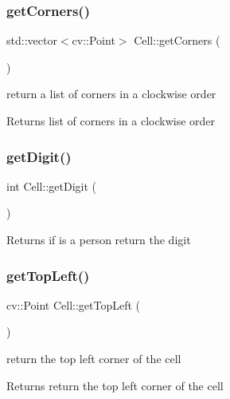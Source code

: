 \subsubsection{\texorpdfstring{get\+Corners()}{getCorners()}}
{\footnotesize\ttfamily std\+::vector$<$cv\+::\+Point$>$ Cell\+::get\+Corners (\begin{DoxyParamCaption}{ }\end{DoxyParamCaption})}

return a list of corners in a clockwise order \begin{DoxyReturn}{Returns}
list of corners in a clockwise order 
\end{DoxyReturn}
\mbox{\label{class_cell_a335c410074aaac9bb5594ea8adf648ff}} 
\subsubsection{\texorpdfstring{get\+Digit()}{getDigit()}}
{\footnotesize\ttfamily int Cell\+::get\+Digit (\begin{DoxyParamCaption}{ }\end{DoxyParamCaption})}

\begin{DoxyReturn}{Returns}
if is a person return the digit 
\end{DoxyReturn}
\mbox{\label{class_cell_ac6e9338748b2098e034641c88a977b23}} 
\subsubsection{\texorpdfstring{get\+Top\+Left()}{getTopLeft()}}
{\footnotesize\ttfamily cv\+::\+Point Cell\+::get\+Top\+Left (\begin{DoxyParamCaption}{ }\end{DoxyParamCaption})}

return the top left corner of the cell \begin{DoxyReturn}{Returns}
return the top left corner of the cell 
\end{DoxyReturn}
\mbox{\label{class_cell_a4b08bffc22a4393fd86c9608d9723d7c}} 
